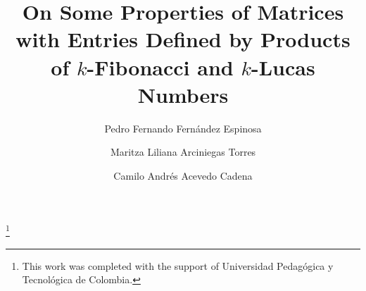 \documentclass[11pt]{birkjour}
\theoremstyle{definition}
\theoremstyle{remark}
\numberwithin{equation}{section}
\begin{document}
%
%
%
%
%
%
%
%
%
\title[On Some Properties of Matrices with Entries Defined by Products of $k$-Fibonacci and $k$-Lucas Numbers]
{On Some Properties of Matrices with Entries Defined by Products of $k$-Fibonacci and $k$-Lucas Numbers}
\author[PFFE]{Pedro Fernando Fern\'andez Espinosa}
\address{Semillero de Investigación ITENUA\\
	Escuela de Matemáticas y Estadistica  \\
	Universidad Pedagógica y Tecnológica de Colombia \\
	Carrera 18 con Calle 22\\
	Duitama - Boyacá\\
    ORCID ID: 0000-0002-2650-4536}
\thanks{This work was completed with the support of Universidad Pedagógica y Tecnológica de Colombia.}
\author[MLAT]{Maritza Liliana Arciniegas Torres}
\address{Semillero de Investigación ITENUA\\
    Escuela de Matemáticas y Estadistica  \\
	Universidad Pedagógica y Tecnológica de Colombia \\
	Carrera 18 con Calle 22\\
	Duitama - Boyacá\\
    ORCID ID: 0009-0003-5189-9976}

\author[CAAC]{Camilo Andrés Acevedo Cadena }
\address{Semillero de Investigación ITENUA\\
    Escuela de Matemáticas y Estadistica  \\
	Universidad Pedagógica y Tecnológica de Colombia \\
	Carrera 18 con Calle 22\\
	Duitama - Boyacá\\
    ORCID ID: 0009-0002-8366-4277}
\end{document}
